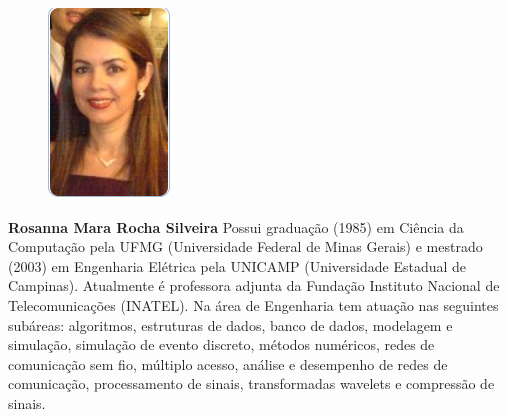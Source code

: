 \begin{figure}
\includegraphics[width=\linewidth]{figuras/autor2.png}  
\end{figure}

   \textbf{Rosanna Mara Rocha Silveira} Possui graduação (1985) em Ciência da Computação pela UFMG (Universidade Federal de Minas Gerais) e mestrado (2003) em Engenharia Elétrica pela UNICAMP (Universidade Estadual de Campinas). Atualmente é professora adjunta da Fundação Instituto Nacional de Telecomunicações (INATEL). Na área de Engenharia tem atuação nas seguintes subáreas: algoritmos, estruturas de dados, banco de dados, modelagem e simulação, simulação de evento discreto, métodos numéricos, redes de comunicação sem fio, múltiplo acesso, análise e desempenho de redes de comunicação, processamento de sinais, transformadas wavelets e compressão de sinais.

